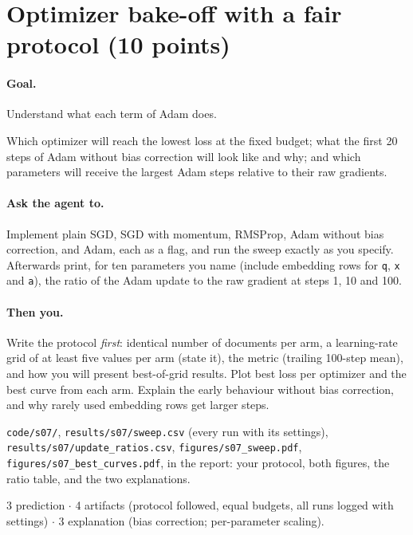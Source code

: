 \documentclass[11pt,letterpaper]{article}
\newcommand{\agent}[1]{\paragraph{Ask the agent to.} #1}
\newcommand{\you}[1]{\paragraph{Then you.} #1}
\newcommand{\goal}[1]{\paragraph{Goal.} #1}
\begin{document}
\section{Optimizer bake-off with a fair protocol \hfill (10 points)}
\goal{Understand what each term of Adam does.}
\begin{predict}
Which optimizer will reach the lowest loss at the fixed budget; what the first 20 steps of Adam without bias correction will look like and why; and which parameters will receive the largest Adam steps relative to their raw gradients.
\end{predict}
\agent{Implement plain SGD, SGD with momentum, RMSProp, Adam without bias correction, and Adam, each as a flag, and run the sweep exactly as you specify. Afterwards print, for ten parameters you name (include embedding rows for \texttt{q}, \texttt{x} and \texttt{a}), the ratio of the Adam update to the raw gradient at steps 1, 10 and 100.}
\you{Write the protocol \emph{first}: identical number of documents per arm, a learning-rate grid of at least five values per arm (state it), the metric (trailing 100-step mean), and how you will present best-of-grid results. Plot best loss per optimizer and the best curve from each arm. Explain the early behaviour without bias correction, and why rarely used embedding rows get larger steps.}
\begin{deliver}
\texttt{code/s07/}, \texttt{results/s07/sweep.csv} (every run with its settings), \texttt{results/s07/update\_ratios.csv}, \texttt{figures/s07\_sweep.pdf}, \texttt{figures/s07\_best\_curves.pdf}, in the report: your protocol, both figures, the ratio table, and the two explanations.
\end{deliver}
\begin{rubric}3 prediction $\cdot$ 4 artifacts (protocol followed, equal budgets, all runs logged with settings) $\cdot$ 3 explanation (bias correction; per-parameter scaling).\end{rubric}

\end{document}
